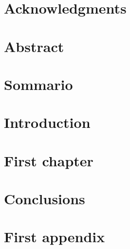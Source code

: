 \documentclass[11pt,oneside,english]{book}
\begin{document}
\frontmatter
\pagestyle{empty}
\restoregeometry

\clearpage{}

\begin{flushright}
\emph{}\clearpage{}
\par\end{flushright}


\chapter*{Acknowledgments}

\thispagestyle{empty}\clearpage{}


\chapter*{Abstract}

\thispagestyle{empty}\clearpage{}


\chapter*{Sommario}

\thispagestyle{empty}\clearpage{}
\setcounter{page}{1}
\pagestyle{fancy}\tableofcontents{}\listoffigures
\listoftables
{}
\clearpage{}\mainmatter
\renewcommand{\sectionmark}[1]{\markright{\thesection.\ #1}}
\renewcommand{\chaptermark}[1]{\markboth{\thechapter.\ #1}{}}


\chapter*{Introduction\label{chap:introduction}}



\chapter{First chapter\label{chap:first-chapter}}





\chapter*{Conclusions\label{chap:conclusion}}




\appendix

\chapter{First appendix\label{app:first-appendix}}



\clearpage{}
\end{document}
